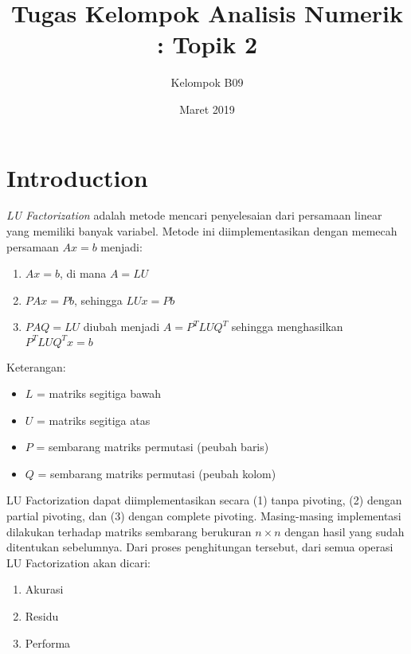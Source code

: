 \documentclass[11pt]{article}
\begin{document}
\author{Kelompok B09}
\title{Tugas Kelompok Analisis Numerik : Topik 2}
\date{Maret 2019}
\maketitle
\medskip

\section{Introduction}

\textit{LU Factorization} adalah metode mencari penyelesaian dari persamaan linear yang memiliki banyak variabel. Metode ini diimplementasikan dengan memecah persamaan $Ax = b$ menjadi:

\begin{enumerate}
    \item $Ax = b$, di mana $A = LU$ %
    \item $PAx = Pb$, sehingga $LUx = Pb$ %
    \item $PAQ = LU$ diubah menjadi $A = P^TLUQ^T$ sehingga menghasilkan $P^TLUQ^Tx = b$ %
\end{enumerate}

Keterangan:
\begin{itemize}
    \item $L$ = matriks segitiga bawah
    \item $U$ = matriks segitiga atas
    \item $P$ = sembarang matriks permutasi (peubah baris)
    \item $Q$ = sembarang matriks permutasi (peubah kolom)
    
\end{itemize}

\vspace{3mm}

LU Factorization dapat diimplementasikan secara (1) tanpa pivoting, (2) dengan partial pivoting, dan (3) dengan complete pivoting. Masing-masing implementasi dilakukan terhadap matriks sembarang berukuran $n \times n$ dengan hasil yang sudah ditentukan sebelumnya. Dari proses penghitungan tersebut, dari semua operasi LU Factorization akan dicari:

\begin{enumerate}
    \item Akurasi
    \item Residu
    \item Performa
\end{enumerate}
\end{document}
